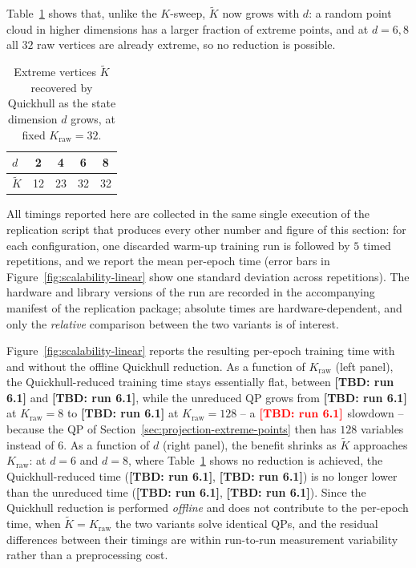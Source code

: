 \documentclass[11pt]{elsarticle}
\newcommand{\TBD}[1]{{\color{red}\textbf{[TBD: #1]}}}
\providecommand{\LCtimingReps}{5}
\providecommand{\LCtimeQHmin}{\TBD{run 6.1}}
\providecommand{\LCtimeQHmax}{\TBD{run 6.1}}
\providecommand{\LCtimeNoQHfirst}{\TBD{run 6.1}}
\providecommand{\LCtimeNoQHlast}{\TBD{run 6.1}}
\providecommand{\LCslowdown}{\TBD{run 6.1}}
\providecommand{\LCtimeQHdSix}{\TBD{run 6.1}}
\providecommand{\LCtimeNoQHdSix}{\TBD{run 6.1}}
\providecommand{\LCtimeQHdEight}{\TBD{run 6.1}}
\providecommand{\LCtimeNoQHdEight}{\TBD{run 6.1}}
\theoremstyle{definition}
\theoremstyle{remark}
\numberwithin{equation}{section}
\begin{document}
Table~\ref{tab:quickhull-d} shows that, unlike the $K$-sweep, $\widetilde{K}$
now grows with $d$: a random point cloud in higher dimensions has a larger
fraction of extreme points, and at $d=6,8$ all $32$ raw vertices are already
extreme, so no reduction is possible.

\begin{table}[htbp]
  \centering
  \begin{tabular}{lcccc}
    \toprule
    $d$             & 2  & 4  & 6  & 8  \\
    \midrule
    $\widetilde{K}$ & 12 & 23 & 32 & 32 \\
    \bottomrule
  \end{tabular}
  \caption{Extreme vertices $\widetilde{K}$ recovered by Quickhull as the
  state dimension $d$ grows, at fixed $K_{\mathrm{raw}}=32$.}
  \label{tab:quickhull-d}
\end{table}

All timings reported here are collected in the same single execution of the
replication script that produces every other number and figure of this
section: for each configuration, one discarded warm-up training run is
followed by $\LCtimingReps$ timed repetitions, and we report the mean
per-epoch time (error bars in Figure~\ref{fig:scalability-linear} show one
standard deviation across repetitions). The hardware and library versions
of the run are recorded in the accompanying manifest of the replication
package; absolute times are hardware-dependent, and only the \emph{relative}
comparison between the two variants is of interest.

Figure~\ref{fig:scalability-linear} reports the resulting per-epoch training
time with and without the offline Quickhull reduction. As a function of
$K_{\mathrm{raw}}$ (left panel), the Quickhull-reduced training time stays
essentially flat, between \LCtimeQHmin{} and \LCtimeQHmax, while the
unreduced QP grows from \LCtimeNoQHfirst{} at $K_{\mathrm{raw}}=8$ to
\LCtimeNoQHlast{} at $K_{\mathrm{raw}}=128$ -- a $\LCslowdown$
slowdown -- because the QP of Section~\ref{sec:projection-extreme-points}
then has $128$ variables instead of $6$. As a function of $d$ (right panel),
the benefit shrinks as $\widetilde{K}$ approaches $K_{\mathrm{raw}}$: at
$d=6$ and $d=8$, where Table~\ref{tab:quickhull-d} shows no reduction is
achieved, the Quickhull-reduced time (\LCtimeQHdSix, \LCtimeQHdEight) is
no longer lower than the unreduced time (\LCtimeNoQHdSix,
\LCtimeNoQHdEight). Since the Quickhull reduction is performed
\emph{offline} and does not contribute to the per-epoch time, when
$\widetilde{K}=K_{\mathrm{raw}}$ the two variants solve identical QPs, and
the residual differences between their timings are within run-to-run
measurement variability rather than a preprocessing cost.
\end{document}
